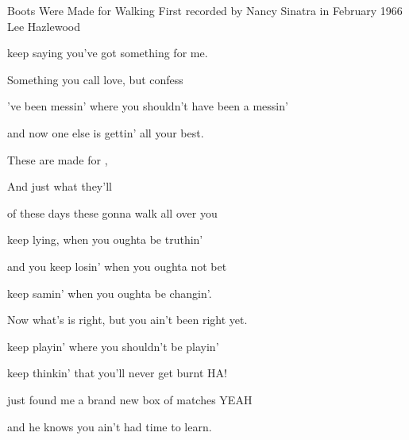 \begin{SBSong}{Boots Were Made for Walking}
  {First recorded by Nancy Sinatra in February 1966}
  {Lee Hazlewood}
  \begin{SBVerse}

     keep saying you've got something for me.
    
    Something you call love, but confess 
    
    've been messin' where you shouldn't have been a messin'
    
    and now one else is gettin' all your best.
  \end{SBVerse}
  \begin{SBChorus}
    These  are made for ,
    
    And  just what they'll 
    
     of these days these   gonna walk all over you
    
  \end{SBChorus}
  \begin{SBVerse}
     keep lying, when you oughta be truthin'
    
    and you keep losin' when you oughta not bet 
    
     keep samin' when you oughta be changin'.
    
    Now what's  is right, but you ain't been right yet.
  \end{SBVerse}
  \begin{SBVerse}
     keep playin' where you shouldn't be playin'
    
    keep thinkin' that you'll never get burnt  HA!
    
     just found me a brand new box of matches YEAH
    
    and  he knows you ain't had time to learn.
  \end{SBVerse}
\end{SBSong}
